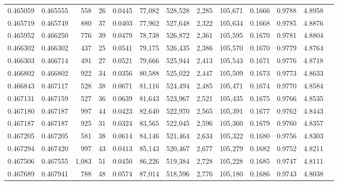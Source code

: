 \begin{tabular}{rrrrrrrrrrrrr}
0.465059 & 0.465555 &   558 &    26 &                                     0.0445 &  77,082 & 528,528 &   2,285 & 105,671 & 0.1666 & 0.9788 & 4.8958 \\
0.465719 & 0.465749 &   880 &    37 &                                     0.0403 &  77,962 & 527,648 &   2,322 & 105,634 & 0.1668 & 0.9785 & 4.8876 \\
0.465952 & 0.466250 &   776 &    39 &                                     0.0479 &  78,738 & 526,872 &   2,361 & 105,595 & 0.1670 & 0.9781 & 4.8804 \\
0.466302 & 0.466302 &   437 &    25 &                                     0.0541 &  79,175 & 526,435 &   2,386 & 105,570 & 0.1670 & 0.9779 & 4.8764 \\
0.466303 & 0.466714 &   491 &    27 &                                     0.0521 &  79,666 & 525,944 &   2,413 & 105,543 & 0.1671 & 0.9776 & 4.8718 \\
0.466802 & 0.466802 &   922 &    34 &                                     0.0356 &  80,588 & 525,022 &   2,447 & 105,509 & 0.1673 & 0.9773 & 4.8633 \\
0.466843 & 0.467117 &   528 &    38 &                                     0.0671 &  81,116 & 524,494 &   2,485 & 105,471 & 0.1674 & 0.9770 & 4.8584 \\
0.467131 & 0.467159 &   527 &    36 &                                     0.0639 &  81,643 & 523,967 &   2,521 & 105,435 & 0.1675 & 0.9766 & 4.8535 \\
0.467180 & 0.467187 &   997 &    44 &                                     0.0423 &  82,640 & 522,970 &   2,565 & 105,391 & 0.1677 & 0.9762 & 4.8443 \\
0.467187 & 0.467187 &   925 &    31 &                                     0.0324 &  83,565 & 522,045 &   2,596 & 105,360 & 0.1679 & 0.9760 & 4.8357 \\
0.467205 & 0.467205 &   581 &    38 &                                     0.0614 &  84,146 & 521,464 &   2,634 & 105,322 & 0.1680 & 0.9756 & 4.8303 \\
0.467294 & 0.467420 &   997 &    43 &                                     0.0413 &  85,143 & 520,467 &   2,677 & 105,279 & 0.1682 & 0.9752 & 4.8211 \\
0.467506 & 0.467555 & 1,083 &    51 &                                     0.0450 &  86,226 & 519,384 &   2,728 & 105,228 & 0.1685 & 0.9747 & 4.8111 \\
0.467689 & 0.467941 &   788 &    48 &                                     0.0574 &  87,014 & 518,596 &   2,776 & 105,180 & 0.1686 & 0.9743 & 4.8038 \\

\end{tabular}
